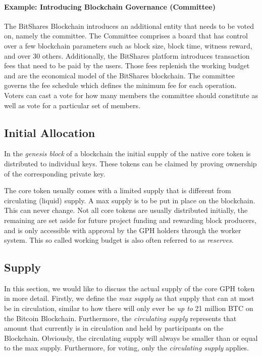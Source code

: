\paragraph{Example: Introducing Blockchain Governance (Committee) }
The BitShares Blockchain introduces an additional entity that needs to be voted on, namely the committee. 
The Committee comprises a board that has control over a few blockchain parameters such as block size, block time, witness reward, and over 30 others. 
Additionally, the BitShares platform introduces transaction fees that need to be paid by the users. Those fees replenish the working budget and are the economical 
model of the BitShares blockchain. The committee governs the fee schedule which defines the minimum fee for each operation. Voters can cast a vote 
for how many members the committee should constitute as well as vote for a particular set of members.

\subsection{ Initial Allocation }
In the \emph{genesis block} of a blockchain the initial supply of the native core token is distributed to individual keys. These tokens can be claimed by proving ownership of the corresponding private key.

The core token usually comes with a limited supply that is different from circulating (liquid) supply. A max supply is to be put in place on the blockchain. This can never change. 
Not all core tokens are usually distributed initially, the remaining are set aside for future project funding and rewarding block 
producers, and is only accessible with approval by the GPH holders through the worker system. This so called working budget is also often referred 
to as \emph{reserves}. 

\subsection{ Supply }
In this section, we would like to discuss the actual supply of the core GPH token in more detail. Firstly, we define the \emph{max supply} as that supply that 
can at most be in circulation, similar to how there will only ever be \emph{up to} 21 million BTC on the Bitcoin Blockchain. Furthermore, the \emph{circulating 
supply} represents that amount that currently is in circulation and held by participants on the Blockchain. Obviously, the circulating supply will 
always be smaller than or equal to the max supply. Furthermore, for voting, only the \emph{circulating supply} applies.

